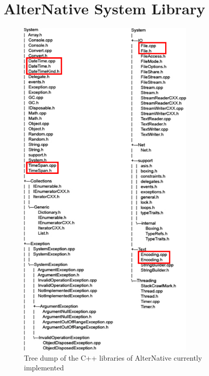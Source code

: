 \section{AlterNative System Library}\label{SS:Libs-AlterNative}
\begin{figure}[H]\begin{center}
 \centering
  \captionsetup{justification=centering}
  \includegraphics[width=0.75\textwidth]{pictures/appendices/alternative-cpp-classes}
  \caption{Tree dump of the C++ libraries of AlterNative currently implemented\label{fig:Libs-AlterNative}}
\end{center}\end{figure}
